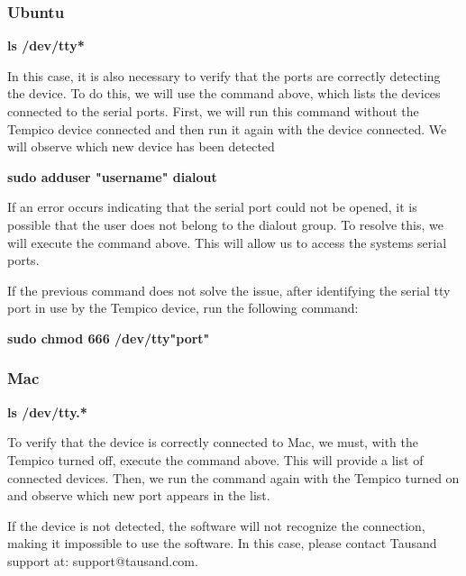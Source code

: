 \documentclass[
]{article}
\begin{document}
\hypertarget{ubuntu-1}{%
\subsubsection{Ubuntu}\label{ubuntu-1}}
\begin{center}
    \textbf{ls /dev/tty*}
\end{center}

In this case, it is also necessary to verify that the ports are
correctly detecting the device. To do this, we will use the command
above, which lists the devices connected to the serial ports. First, we
will run this command without the Tempico device connected and then run
it again with the device connected. We will observe which new device has
been detected

\begin{center}
    \textbf{sudo adduser "username" dialout}
\end{center}


If an error occurs indicating that the serial port could not be opened,
it is possible that the user does not belong to the dialout group. To
resolve this, we will execute the command above. This will allow us to
access the system\textquotesingle s serial ports.

If the previous command does not solve the issue, after identifying the serial tty port in use by the Tempico device, run the following command:

\begin{center}
    \textbf{sudo chmod 666 /dev/tty"port"}
\end{center}

\hypertarget{mac-1}{%
\subsubsection{Mac}\label{mac-1}}

\begin{center}
    \textbf{ls /dev/tty.*}
\end{center}


To verify that the device is correctly connected to Mac, we must, with
the Tempico turned off, execute the command above. This will provide a
list of connected devices. Then, we run the command again with the
Tempico turned on and observe which new port appears in the list.

If the device is not detected, the software will not recognize the
connection, making it impossible to use the software. In this case,
please contact Tausand support at: support@tausand.com.
\end{document}
